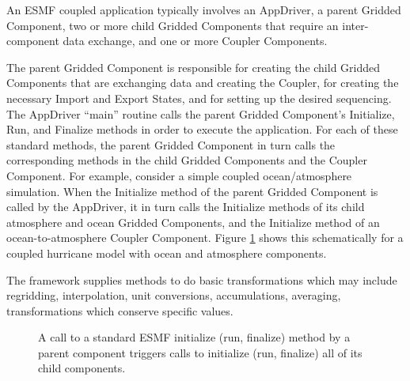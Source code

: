 An ESMF coupled application typically involves an AppDriver, a parent 
Gridded Component, two or more child Gridded Components that require 
an inter-component data exchange, and one or more Coupler 
Components. 

The parent Gridded Component is responsible for creating the child 
Gridded Components that are exchanging data and creating the Coupler, 
for creating the necessary Import and Export States, and for 
setting up the desired sequencing.  The AppDriver ``main'' routine
calls the parent Gridded Component's Initialize, Run, and Finalize 
methods in order to execute the application.  For each of these
standard methods, the parent Gridded Component in turn calls the 
corresponding methods in the child Gridded Components and the 
Coupler Component.  For example, consider a simple coupled 
ocean/atmosphere simulation.  When the Initialize method of the 
parent Gridded Component is called by the AppDriver, it in turn 
calls the Initialize methods of its child atmosphere and ocean 
Gridded Components, and the Initialize method of an 
ocean-to-atmosphere Coupler Component.  Figure \ref{fig:appunit}
shows this schematically for a coupled hurricane model with ocean
and atmosphere components.

The framework supplies methods to do basic transformations which 
may include regridding, interpolation, unit conversions, 
accumulations, averaging, transformations which conserve specific 
values.

\begin{center}
\begin{figure}
\caption{A call to a standard ESMF initialize (run, finalize) method
by a parent component triggers calls to initialize (run, finalize) 
all of its child components.}
\label{fig:appunit}
\end{figure}
\end{center}


